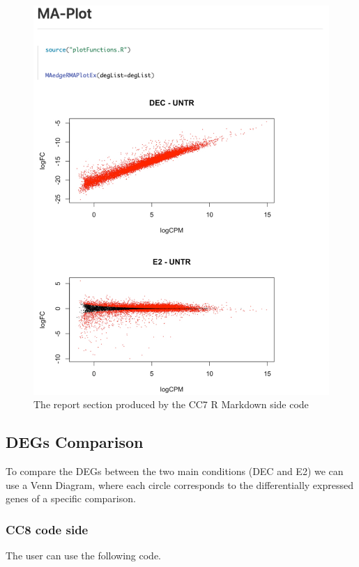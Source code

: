 \documentclass[
]{article}
\newenvironment{Shaded}{\begin{snugshade}}{\end{snugshade}}
\newcommand{\AttributeTok}[1]{\textcolor[rgb]{0.77,0.63,0.00}{#1}}
\newcommand{\DecValTok}[1]{\textcolor[rgb]{0.00,0.00,0.81}{#1}}
\newcommand{\FunctionTok}[1]{\textcolor[rgb]{0.00,0.00,0.00}{#1}}
\newcommand{\NormalTok}[1]{#1}
\newcommand{\SpecialCharTok}[1]{\textcolor[rgb]{0.00,0.00,0.00}{#1}}
\newcommand{\StringTok}[1]{\textcolor[rgb]{0.31,0.60,0.02}{#1}}
\begin{document}
\begin{figure}[ht]

{\centering \includegraphics[width=0.7\linewidth]{imgs/7} 

}

\caption{The report section produced by the CC7 R Markdown side code}\label{fig:unnamed-chunk-16}
\end{figure}

\hypertarget{degs-comparison}{%
\subsection{DEGs Comparison}\label{degs-comparison}}

To compare the DEGs between the two main conditions (DEC and E2) we can
use a Venn Diagram, where each circle corresponds to the differentially
expressed genes of a specific comparison.

\hypertarget{cc8-code-side}{%
\subsubsection{CC8 code side}\label{cc8-code-side}}

The user can use the following code.

\begin{Shaded}
\end{Shaded}
\end{document}
